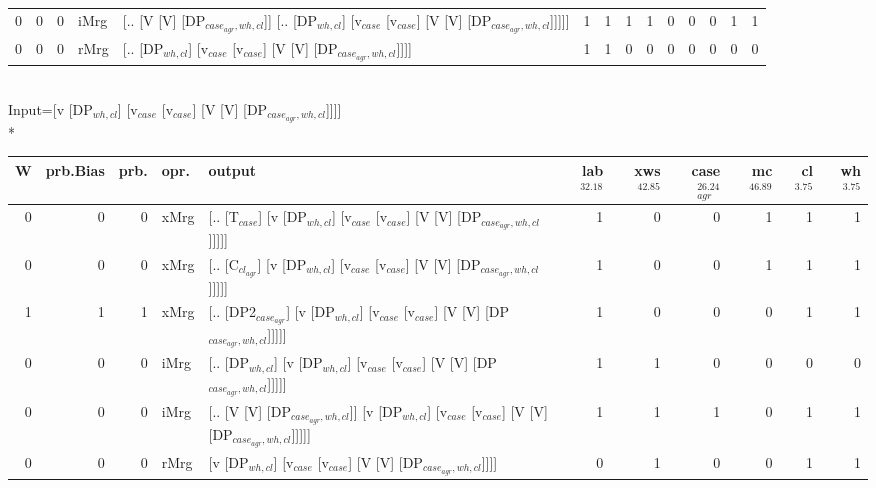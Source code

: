 \begin{tabularx}{\linewidth}{rrrlXrrrrrrrrr}
   0 &       0 &   0 & iMrg & [.. [V [V] [DP$_{case_{agr},wh,cl}$]] [.. [DP$_{wh,cl}$] [v$_{case}$ [v$_{case}$] [V [V] [DP$_{case_{agr},wh,cl}$]]]]]                   &             1 &             1 &                  1 &            1 &              0 &               0 &             0 &        1 &        1 \\
   0 &       0 &   0 & rMrg & [.. [DP$_{wh,cl}$] [v$_{case}$ [v$_{case}$] [V [V] [DP$_{case_{agr},wh,cl}$]]]]                                                    &             1 &             1 &                  0 &            0 &              0 &               0 &             0 &        0 &        0 \\
\hline
\end{tabularx}\endgroup\\
\begingroup\scriptsize Input=[v [DP$_{wh,cl}$] [v$_{case}$ [v$_{case}$] [V [V] [DP$_{case_{agr},wh,cl}$]]]]\\*
\begin{tabularx}{\linewidth}{rrrlXrrrrrr}
\hline
   W &   prb.Bias &   prb. & opr.   & output                                                                                        &   lab$^{32.18}$ &   xws$^{42.85}$ &   case$_{agr}^{26.24}$ &   mc$^{46.89}$ &   cl$^{3.75}$ &   wh$^{3.75}$ \\
\hline
   0 &       0 &   0 & xMrg & [.. [T$_{case}$] [v [DP$_{wh,cl}$] [v$_{case}$ [v$_{case}$] [V [V] [DP$_{case_{agr},wh,cl}$]]]]]                    &             1 &             0 &                  0 &            1 &        1 &        1 \\
   0 &       0 &   0 & xMrg & [.. [C$_{cl_{agr}}$] [v [DP$_{wh,cl}$] [v$_{case}$ [v$_{case}$] [V [V] [DP$_{case_{agr},wh,cl}$]]]]]                  &             1 &             0 &                  0 &            1 &        1 &        1 \\
   1 &       1 &   1 & xMrg & [.. [DP2$_{case_{agr}}$] [v [DP$_{wh,cl}$] [v$_{case}$ [v$_{case}$] [V [V] [DP$_{case_{agr},wh,cl}$]]]]]              &             1 &             0 &                  0 &            0 &        1 &        1 \\
   0 &       0 &   0 & iMrg & [.. [DP$_{wh,cl}$] [v [DP$_{wh,cl}$] [v$_{case}$ [v$_{case}$] [V [V] [DP$_{case_{agr},wh,cl}$]]]]]                  &             1 &             1 &                  0 &            0 &        0 &        0 \\
   0 &       0 &   0 & iMrg & [.. [V [V] [DP$_{case_{agr},wh,cl}$]] [v [DP$_{wh,cl}$] [v$_{case}$ [v$_{case}$] [V [V] [DP$_{case_{agr},wh,cl}$]]]]] &             1 &             1 &                  1 &            0 &        1 &        1 \\
   0 &       0 &   0 & rMrg & [v [DP$_{wh,cl}$] [v$_{case}$ [v$_{case}$] [V [V] [DP$_{case_{agr},wh,cl}$]]]]                                  &             0 &             1 &                  0 &            0 &        1 &        1 \\
\hline
\end{tabularx}\endgroup\\
